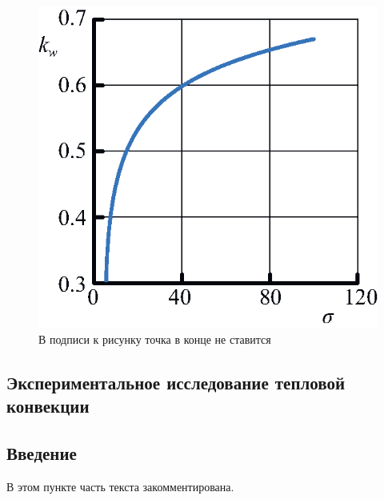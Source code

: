 \documentclass[14pt,a4paper,oneside]{extarticle}	%
\begin{document}
	\begin{figure}[h!] 	%
		\centering 		%
		\includegraphics{101} %
		\caption{В подписи к рисунку точка в конце не ставится}
	\end{figure}
	
\newpage

	\begin{center}
		\section{Экспериментальное исследование тепловой конвекции} 			%
	\end{center}

	\subsection{Введение} 	%

В этом пункте часть текста закомментирована.
	

\end{document}
